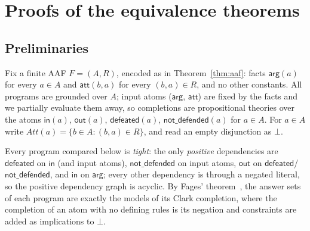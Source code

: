 \documentclass[review,12pt]{elsarticle}
\theoremstyle{definition}
\theoremstyle{remark}
\newcommand{\pred}[1]{\textsf{#1}}
\newcommand{\Att}{\mathit{Att}}
\begin{document}
\section{Proofs of the equivalence theorems}
\label{app:proofs}

\subsection{Preliminaries}
\label{app:prelim}

Fix a finite AAF $F=(A,R)$, encoded as in Theorem~\ref{thm:aaf}: facts
$\pred{arg}(a)$ for every $a\in A$ and $\pred{att}(b,a)$ for every
$(b,a)\in R$, and no other constants. All programs are grounded over $A$;
input atoms ($\pred{arg}$, $\pred{att}$) are fixed by the facts and we
partially evaluate them away, so completions are propositional theories over
the atoms $\pred{in}(a)$, $\pred{out}(a)$, $\pred{defeated}(a)$,
$\pred{not\_defended}(a)$ for $a\in A$. For $a\in A$ write
$\Att(a)=\{b\in A:(b,a)\in R\}$, and read an empty disjunction as $\bot$.

Every program compared below is \emph{tight}: the only \emph{positive}
dependencies are $\pred{defeated}$ on $\pred{in}$ (and input atoms),
$\pred{not\_defended}$ on input atoms, $\pred{out}$ on
$\pred{defeated}$/$\pred{not\_defended}$, and $\pred{in}$ on $\pred{arg}$;
every other dependency is through a negated literal, so the positive
dependency graph is acyclic. By Fages'
theorem~\citep{fages1994,erdem2003}, the answer sets of each program are
exactly the models of its Clark completion, where the completion of an atom
with no defining rules is its negation and constraints are added as
implications to $\bot$.
\end{document}
